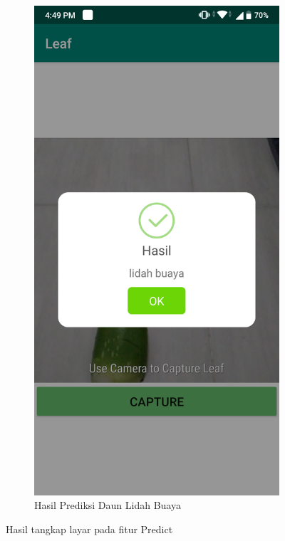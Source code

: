 \begin{figure}[ht]
\begin{subfigure}{0.5\textwidth}
	\end{subfigure}
	~
	\begin{subfigure}{0.5\textwidth}
		\centering\includegraphics[width=\linewidth]{bab5/figures/ss1hasil.png}
		\caption{Hasil Prediksi Daun Lidah Buaya}
		\label{fig:hasil1}
	\end{subfigure}
\caption{Hasil tangkap layar pada fitur Predict}
\end{figure}

